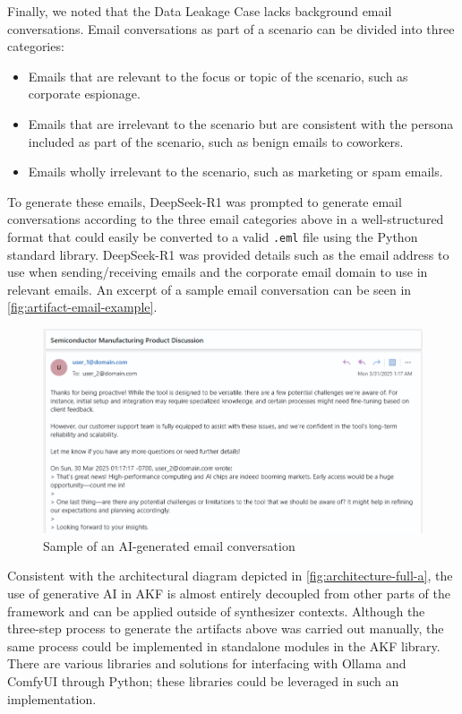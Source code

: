 \documentclass[letterpaper,12pt]{report}
\def\tightlist{}
\newcommand{\passthrough}[1]{#1}
\begin{document}
Finally, we noted that the Data Leakage Case lacks background email
conversations. Email conversations as part of a scenario can be divided
into three categories:

\begin{itemize}
\tightlist
\item
  Emails that are relevant to the focus or topic of the scenario, such
  as corporate espionage.
\item
  Emails that are irrelevant to the scenario but are consistent with the
  persona included as part of the scenario, such as benign emails to
  coworkers.
\item
  Emails wholly irrelevant to the scenario, such as marketing or spam
  emails.
\end{itemize}

To generate these emails, DeepSeek-R1 was prompted to generate email
conversations according to the three email categories above in a
well-structured format that could easily be converted to a valid
\passthrough{\lstinline!.eml!} file using the Python standard library.
DeepSeek-R1 was provided details such as the email address to use when
sending/receiving emails and the corporate email domain to use in
relevant emails. An excerpt of a sample email conversation can be seen
in \autoref{fig:artifact-email-example}.

\begin{figure}[htbp]
\centering
\includegraphics[width=1\linewidth]{email_snippet.png}
\caption{Sample of an AI-generated email
conversation}\label{fig:artifact-email-example}
\end{figure}

Consistent with the architectural diagram depicted in
\autoref{fig:architecture-full-a}, the use of generative AI in AKF is
almost entirely decoupled from other parts of the framework and can be
applied outside of synthesizer contexts. Although the three-step process
to generate the artifacts above was carried out manually, the same
process could be implemented in standalone modules in the AKF library.
There are various libraries and solutions for interfacing with Ollama
and ComfyUI through Python; these libraries could be leveraged in such
an implementation.
\end{document}
